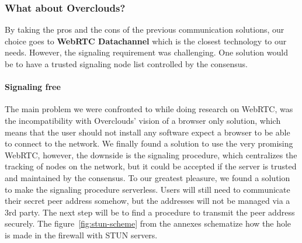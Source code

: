 \subsubsection{What about Overclouds?}
By taking the pros and the cons of the previous communication solutions, our choice goes to \textbf{WebRTC Datachannel} which is the closest technology to our needs. However, the signaling requirement was challenging. One solution would be to have a trusted signaling node list controlled by the consensus. 

\paragraph{Signaling free} The main problem we were confronted to while doing research on WebRTC, was the incompatibility with Overclouds' vision of a browser only solution, which means that the user should not install any software expect a browser to be able to connect to the network. We finally found a solution to use the very promising WebRTC, however, the downside is the signaling procedure, which centralizes the tracking of nodes on the network, but it could be accepted if the server is trusted and maintained by the consensus. To our greatest pleasure, we found a solution to make the signaling procedure serverless. Users will still need to communicate their secret peer address somehow, but the addresses will not be managed via a 3rd party. The next step will be to find a procedure to transmit the peer address securely. The figure~\ref{fig:stun-scheme} from the annexes schematize how the hole is made in the firewall with STUN servers.

